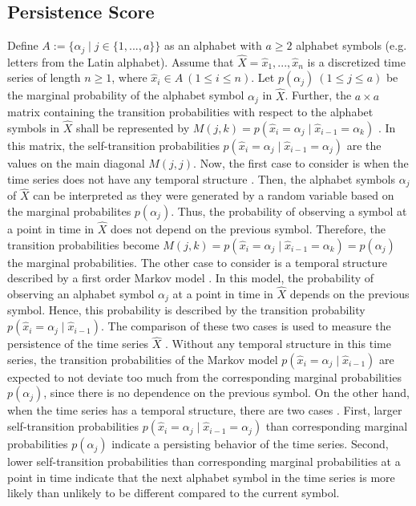 \subsection*{Persistence Score}
Define $A := \{\alpha_j \mid j \in \{1, ..., a\}\}$ as an alphabet with $a \geq 2$ alphabet symbols (e.g. letters from the Latin alphabet). Assume that $\hat{X} = \hat{x}_1, ..., \hat{x}_n$ is a discretized time series of length $n \geq 1$, where $\hat{x}_i \in A \ (1 \leq i \leq n)$. Let $p(\alpha_j) \ (1 \leq j \leq a)$ be the marginal probability of the alphabet symbol $\alpha_j$ in $\hat{X}$. Further, the $a \times a$ matrix containing the transition probabilities with respect to the alphabet symbols in $\hat{X}$ shall be represented by \mbox{$M(j,k) = p(\hat{x}_i = \alpha_j \mid \hat{x}_{i-1} = \alpha_k)$} \cite{Persist}. In this matrix, the self-transition probabilities $p(\hat{x}_i = \alpha_j \mid \hat{x}_{i-1} = \alpha_j)$ are the values on the main diagonal $M(j,j)$. \newline
Now, the first case to consider is when the time series does not have any temporal structure \cite{Persist}. Then, the alphabet symbols $\alpha_j$ of $\hat{X}$ can be interpreted as they were generated by a random variable based on the marginal probabilites $p(\alpha_j)$. Thus, the probability of observing a symbol at a point in time in $\hat{X}$ does not depend on the previous symbol. Therefore, the transition probabilities become $M(j,k) = p(\hat{x}_i = \alpha_j \mid \hat{x}_{i-1} = \alpha_k) = p(\alpha_j)$ the marginal probabilities. \newline
The other case to consider is a temporal structure described by a first order Markov model \cite{Persist}. In this model, the probability of observing an alphabet symbol $\alpha_j$ at a point in time in $\hat{X}$ depends on the previous symbol. Hence, this probability is described by the transition probability $p(\hat{x}_i = \alpha_j \mid \hat{x}_{i-1})$. \newline
The comparison of these two cases is used to measure the persistence of the time series $\hat{X}$ \cite{Persist}. Without any temporal structure in this time series, the transition probabilities of the Markov model $p(\hat{x}_i = \alpha_j \mid \hat{x}_{i-1})$ are expected to not deviate too much from the corresponding marginal probabilities $p(\alpha_j)$, since there is no dependence on the previous symbol. \newline
On the other hand, when the time series has a temporal structure, there are two cases \cite{Persist}. First, larger self-transition probabilities $p(\hat{x}_i = \alpha_j \mid \hat{x}_{i-1} = \alpha_j)$ than corresponding marginal probabilities $p(\alpha_j)$ indicate a persisting behavior of the time series. Second, lower self-transition probabilities than corresponding marginal probabilities at a point in time indicate that the next alphabet symbol in the time series is more likely than unlikely to be different compared to the current symbol. \newline
